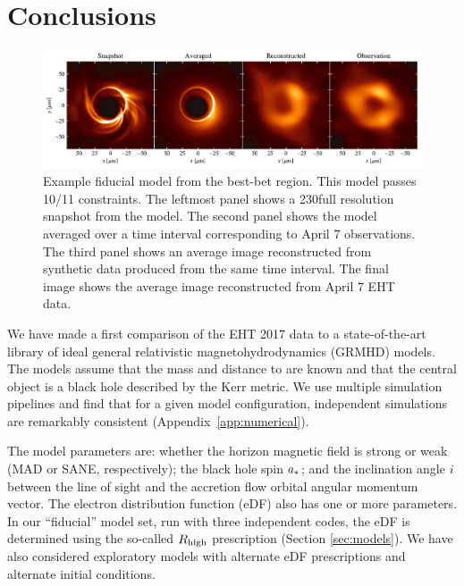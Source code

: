 \section{Conclusions}
\label{sec:conclusions}

\begin{figure}
  \centering
  \includegraphics[width=\textwidth]{figures/bestbet_imgs.pdf}
  \caption{
    Example fiducial model from the best-bet region.  This model passes 10/11 constraints.  The leftmost panel shows a 230\GHz full resolution snapshot from the model.  The second panel shows the model averaged over a time interval corresponding to April 7 observations.  The third panel shows an average image reconstructed from synthetic data produced from the same time interval.  The final image shows the average image reconstructed from April 7 EHT data.
    }
  \label{fig:bestbet_imgs}
\end{figure}

We have made a first comparison of the EHT 2017 \sgra data to a state-of-the-art library of ideal general relativistic magnetohydrodynamics (GRMHD) models.
The models assume that the mass and distance to \sgra are known and that the central object is a black hole described by the Kerr metric.
We use multiple simulation pipelines and find that for a given model configuration, independent simulations are remarkably consistent (Appendix~\ref{app:numerical}).

The model parameters are: whether the horizon magnetic field is strong or weak (MAD or SANE, respectively); the black hole spin $a_*$; and the inclination angle $i$ between the line of sight and the accretion flow orbital angular momentum vector.
The electron distribution function (eDF) also has one or more parameters.
In our ``fiducial'' model set, run with three independent codes, the eDF is determined using the so-called $R_\mathrm{high}$ prescription (Section \ref{sec:models}).
We have also considered exploratory models with alternate eDF prescriptions and alternate initial conditions.

